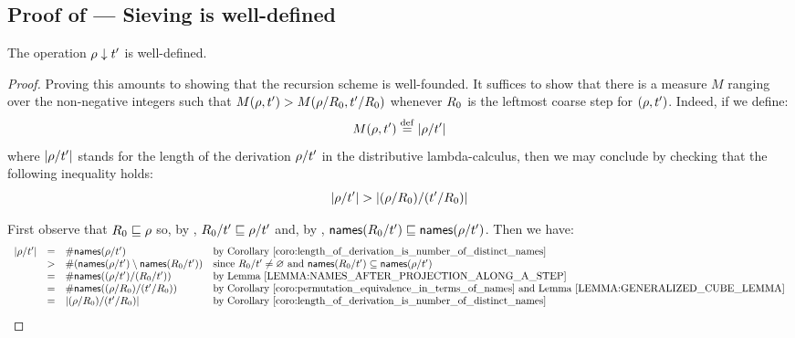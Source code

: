 
\subsection*{Proof of  --- Sieving is well-defined}
\label{sieving_is_well_defined_proof}
The operation $\rho \downarrow t'$ is well-defined.
\begin{proof}
Proving this amounts to showing that the recursion scheme is well-founded.
It suffices to show that there is a measure $M$ ranging over the non-negative
integers such that
$M(\rho,t') > M(\rho/R_0,t'/R_0)$
whenever $R_0$ is the leftmost coarse step for $(\rho,t')$.
Indeed, if we define:
\[
  M(\rho,t') \overset{\mathrm{def}}{=} |\rho/t'|
\]
where $|\rho/t'|$ stands for the length of the derivation $\rho/t'$
in the distributive lambda-calculus, then we may conclude by checking that the following inequality holds:
\[
  |\rho/t'| > |(\rho/R_0)/(t'/R_0)|
\]

First observe that
$R_0 \sqsubseteq \rho$
so, by ,
$R_0/t' \sqsubseteq \rho/t'$
and, by ,
$\mathsf{names}(R_0/t') \sqsubseteq \mathsf{names}(\rho/t')$.
Then we have:
\[
  \begin{array}{rcll}
  \lengthof{\redseq/\tm'}
   & = & \#\names(\redseq/\tm') & \text{by \rcoro{length_of_derivation_is_number_of_distinct_names}} \\
   & > & \#(\names(\redseq/\tm') \setminus \names(\redex_0/\tm')) & \text{since $\redex_0/\tm' \neq \emptyset$ and $\names(\redex_0/\tm') \subseteq \names(\redseq/\tm')$} \\
   & = & \#\names((\redseq/\tm') / (\redex_0/\tm')) & \text{by \rlem{names_after_projection_along_a_step}} \\
   & = & \#\names((\redseq/\redex_0) / (\tm'/\redex_0)) & \text{by \rcoro{permutation_equivalence_in_terms_of_names} and \rlem{generalized_cube_lemma}} \\
   & = & \lengthof{(\redseq/\redex_0) / (\tm'/\redex_0)} & \text{by \rcoro{length_of_derivation_is_number_of_distinct_names}}
  \end{array}
\]
\end{proof}

